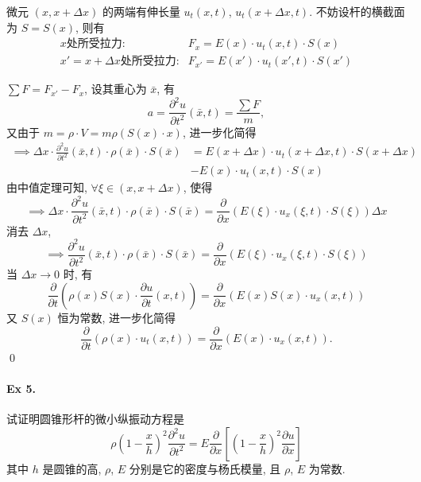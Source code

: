 \begin{solution}
微元 $(x, x + \Delta x)$ 的两端有伸长量 $u_t(x, t)$,
$u_t(x + \Delta x, t)$. 不妨设杆的横截面为 $S = S(x)$, 则有
\[ \begin{aligned}
x\text{处所受拉力:} & F_x = E(x) \cdot u_t(x, t) \cdot S(x) \\
x' = x + \Delta x\text{处所受拉力:} & F_{x'} = E(x') \cdot u_t(x', t)\cdot S(x')
\end{aligned} \]

$\sum F = F_{x'} - F_x$, 设其重心为 $\bar x$, 有
\[
a = \frac{\partial^2 u}{\partial t^2}(\bar x, t) = \frac{\sum F}{m},
\]
又由于 $m = \rho \cdot V = m \rho (S(x) \cdot x)$, 进一步化简得
\[ \begin{aligned}
\implies \Delta x \cdot \frac{\partial^2 u}{\partial t^2}(\bar x, t)
\cdot \rho(\bar x) \cdot S(\bar x)
&= E(x + \Delta x) \cdot u_t(x + \Delta x, t)\cdot S(x + \Delta x) \\
&- E(x) \cdot u_t(x, t) \cdot S(x)
\end{aligned} \]
由中值定理可知, $\forall \xi \in (x, x + \Delta x)$, 使得
\[
\implies \Delta x \cdot \frac{\partial^2 u}{\partial t^2}(\bar x, t)
\cdot \rho(\bar x) \cdot S(\bar x) =
\frac{\partial}{\partial x}\left(
  E(\xi) \cdot u_x(\xi, t) \cdot S(\xi)
\right) \Delta x
\]
消去 $\Delta x$,
\[
\implies \frac{\partial^2 u}{\partial t^2}(\bar x, t)
\cdot \rho(\bar x) \cdot S(\bar x) =
\frac{\partial}{\partial x}\left( E(\xi) \cdot u_x(\xi, t) \cdot S(\xi) \right)
\]
当 $\Delta x \to 0$ 时, 有
\[
\frac{\partial}{\partial t}\left(
  \rho(x)S(x) \cdot \frac{\partial u}{\partial t}(x, t)
\right) =
\frac{\partial}{\partial x}\left( E(x) S(x) \cdot u_x(x, t)\right)
\]
又 $S(x)$ 恒为常数, 进一步化简得
\[
\frac{\partial}{\partial t}\left( \rho(x)\cdot u_t(x, t) \right) =
\frac{\partial}{\partial x}\left( E(x) \cdot u_x(x, t) \right).
\]
\qed
\end{solution}


\paragraph{Ex 5.}
试证明圆锥形杆的微小纵振动方程是
\[
\rho (1 - \frac{x}{h})^2 \frac{\partial^2 u}{\partial t^2}
= E \frac{\partial}{\partial x}
[(1 - \frac{x}{h})^2 \frac{\partial u}{\partial x} ]
\]
其中 $h$ 是圆锥的高, $\rho$, $E$ 分别是它的密度与杨氏模量, 且 $\rho$, $E$ 为常数.

